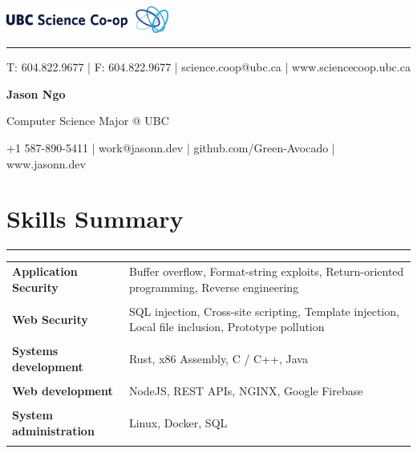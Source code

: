 \documentclass[letterpaper]{article}
\newcommand{\sect}[1]{\section*{#1}
                        {\color{cyan}
                        \rule{\textwidth}{1pt}
                        \vspace{-1ex}}}
\begin{document}
    \begin{flushright}
        \includegraphics[width=0.4\textwidth]{ScienceCo-opLogo_UBC_H.eps}
    \end{flushright}

    \vspace{-2ex}
    \begin{minipage}{\dimexpr(\textwidth-56pt)}
        \begin{flushright}
        {\color{ubclightblue}\rule{\textwidth}{0.5pt}}

        {\small\color{ubcblue}
          T: 604.822.9677
        | F: 604.822.9677
        | science.coop@ubc.ca
        | www.sciencecoop.ubc.ca}
        \end{flushright}
    \end{minipage}

    {\Huge
    \textbf{Jason Ngo}}

    \vspace{1ex}
    {\large
    Computer Science Major @ UBC}

    {\small
      +1 587-890-5411
    | work@jasonn.dev
    | github.com/Green-Avocado
    | www.jasonn.dev
    }
    \vspace{1ex}

    \sect{Skills Summary}

        \begin{tabular}{p{}
                        p{}}
            \textbf{Application Security} &
                Buffer overflow,
                Format-string exploits,
                Return-oriented programming,
                Reverse engineering
                \\
                \\
            \textbf{Web Security} &
                SQL injection,
                Cross-site scripting,
                Template injection,
                Local file inclusion,
                Prototype pollution
                \\
                \\
            \textbf{Systems development} &
                Rust,
                x86 Assembly,
                C / C++,
                Java
                \\
                \\
            \textbf{Web development} &
                NodeJS,
                REST APIs,
                NGINX,
                Google Firebase
                \\
                \\
            \textbf{System administration} &
                Linux,
                Docker,
                SQL
                \\
                \\
        \end{tabular}
\end{document}
